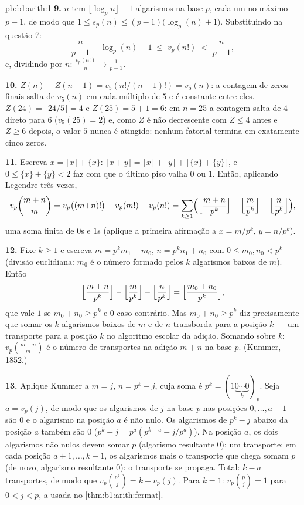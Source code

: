 \begin{solution}{pb:b1:arith:1}
\textbf{9.} $n$ tem $\lfloor \log_p n \rfloor + 1$ algarismos na base
$p$, cada um no máximo $p - 1$, de modo que $1 \leq s_p(n) \leq
(p-1)\bigl(\log_p(n) + 1\bigr)$. Substituindo na questão 7:
\[
\frac n{p-1} - \log_p(n) - 1 \;\leq\; v_p(n!) \;<\; \frac n{p-1},
\]
e, dividindo por $n$: $\frac{v_p(n!)}n \to \frac1{p-1}$.

\textbf{10.} $Z(n) - Z(n-1) = v_5(n!/(n-1)!) = v_5(n)$: a contagem
de zeros finais salta de $v_5(n)$ em cada múltiplo de $5$ e é
constante entre eles. $Z(24) = \lfloor24/5\rfloor = 4$ e $Z(25) =
5 + 1 = 6$: em $n = 25$ a contagem salta de $4$ direto para $6$
($v_5(25) = 2$) e, como $Z$ é não decrescente com $Z \leq 4$
antes e $Z \geq 6$ depois, o valor $5$ nunca é atingido: nenhum
fatorial termina em exatamente cinco zeros.

\textbf{11.} Escreva $x = \lfloor x\rfloor + \{x\}$: $\lfloor x +
y\rfloor = \lfloor x\rfloor + \lfloor y\rfloor + \lfloor \{x\} +
\{y\}\rfloor$, e $0 \leq \{x\} + \{y\} < 2$ faz com que o último piso valha
$0$ ou $1$. Então, aplicando Legendre três vezes,
\[
v_p\binom{m+n}m = v_p\bigl((m{+}n)!\bigr) - v_p(m!) - v_p(n!)
= \sum_{k\geq1}\Bigl(
\Bigl\lfloor\frac{m+n}{p^k}\Bigr\rfloor
- \Bigl\lfloor\frac{m}{p^k}\Bigr\rfloor
- \Bigl\lfloor\frac{n}{p^k}\Bigr\rfloor\Bigr),
\]
uma soma finita de $0$s e $1$s (aplique a primeira afirmação a $x =
m/p^k$, $y = n/p^k$).

\textbf{12.} Fixe $k \geq 1$ e escreva $m = p^km_1 + m_0$, $n =
p^kn_1 + n_0$ com $0 \leq m_0, n_0 < p^k$ (divisão euclidiana:
$m_0$ é o número formado pelos $k$ algarismos baixos de $m$). Então
\[
\Bigl\lfloor\frac{m+n}{p^k}\Bigr\rfloor
- \Bigl\lfloor\frac m{p^k}\Bigr\rfloor
- \Bigl\lfloor\frac n{p^k}\Bigr\rfloor
= \Bigl\lfloor\frac{m_0 + n_0}{p^k}\Bigr\rfloor ,
\]
que vale $1$ se $m_0 + n_0 \geq p^k$ e $0$ caso contrário. Mas $m_0 +
n_0 \geq p^k$ diz precisamente que somar os $k$ algarismos baixos de $m$
e de $n$ transborda para a posição $k$ --- um transporte para a posição
$k$ no algoritmo escolar da adição. Somando sobre $k$:
$v_p\binom{m+n}m$ é o número de transportes na
adição $m + n$ na base $p$. (Kummer, 1852.)

\textbf{13.} Aplique Kummer a $m = j$, $n = p^k - j$, cuja soma é $p^k =
(1\underbrace{0\cdots0}_{k})_p$. Seja $a = v_p(j)$, de modo que os
algarismos de $j$ na base $p$ nas posições $0, \dots, a-1$ são $0$ e o
algarismo na posição $a$ é não nulo. Os algarismos de $p^k - j$ abaixo da
posição $a$ também são $0$ ($p^k - j = p^a(p^{k-a} - j/p^a)$). Na posição
$a$, os dois algarismos não nulos devem somar $p$ (algarismo resultante
$0$): um transporte; em cada posição $a+1, \dots, k-1$, os algarismos
mais o transporte que chega somam $p$ (de novo, algarismo resultante
$0$): o transporte se propaga. Total: $k - a$ transportes, de modo que
$v_p\binom{p^k}j = k -
v_p(j)$. Para $k = 1$: $v_p\binom pj = 1$ para $0 < j < p$, a
 usada no \cref{thm:b1:arith:fermat}.


\end{solution}
